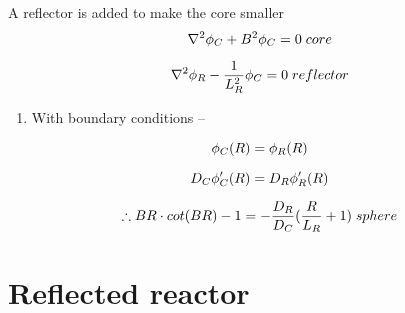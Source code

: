 \documentclass[aspectratio=1610,pdftex,dvipsnames,compress,xcolor={dvipsnames}]{beamer}
\begin{document}
\addtocounter{framenumber}{-1} 
\begin{frame}{A reflector is added to make the core smaller}
    \begin{equation}
        \LARGE
        \nabla^2 \phi_C + B^2 \phi_C = 0 \; core
    \end{equation}

    \begin{equation}
        \LARGE
        \nabla^2 \phi_R - \frac{1}{L^2_R} \phi_C = 0 \; reflector
    \end{equation}

    \vspace*{\fill}

    \begin{enumerate}[series=outerlist,topsep=0pt,itemsep=11pt,leftmargin=*,label=(\arabic*)]
        \item[]With boundary conditions --
    \end{enumerate}

    \vspace*{\fill}

    \begin{equation}
        \LARGE
        \phi_C(R) = \phi_R(R)
    \end{equation}

    \begin{equation}
        \LARGE
        D_C \phi'_C(R) = D_R\phi'_R(R)
    \end{equation}

    \begin{equation}
        \LARGE
        \therefore BR \cdot cot(BR) - 1 = -\frac{D_R}{D_C} (\frac{R}{L_R} + 1) \; sphere
    \end{equation}
\end{frame}


\section{Reflected reactor}
\end{document}
